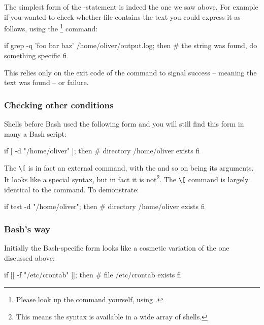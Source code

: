 \documentclass{olli-handout}
\begin{document}
The simplest form of the -statement is indeed the one we saw above. For example if you wanted to check whether file  contains the text  you could express it as follows, using the \footnote{Please look up the command yourself, using .} command:

\begin{lstbash}
if grep -q 'foo bar baz' /home/oliver/output.log; then
  # the string was found, do something specific
fi
\end{lstbash}

This relies only on the exit code of the  command to signal success -- meaning the text was found -- or failure.

\subsubsection{Checking other conditions}

Shells before Bash used the following form and you will still find this form in many a Bash script:

\begin{lstbash}
if [ -d "/home/oliver" ]; then
  # directory /home/oliver exists
fi
\end{lstbash}

The \verb|\[| is in fact an external command, with the  and so on being its arguments. It looks like a special syntax, but in fact it is not\footnote{This means the syntax is available in a wide array of shells.}. The \verb|\[| command is largely identical to the  command. To demonstrate:

\begin{lstbash}
if test -d "/home/oliver"; then
  # directory /home/oliver exists
fi
\end{lstbash}

\subsubsection{Bash's way}\label{bash_tests}

\begin{refmanbash}
\end{refmanbash}

Initially the Bash-specific form looks like a cosmetic variation of the one discussed above:

\begin{lstbash}
if [[ -f "/etc/crontab" ]]; then
  # file /etc/crontab exists
fi
\end{lstbash}
\end{document}
